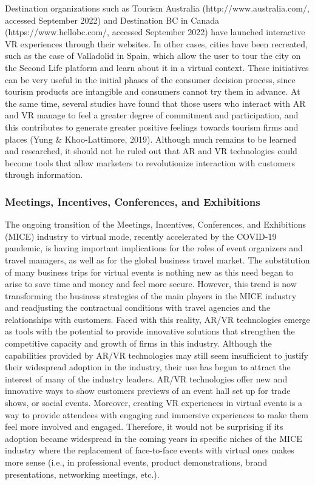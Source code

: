 \documentclass[
  letterpaper,
  DIV=11,
  numbers=noendperiod]{scrreprt}
\begin{document}
Destination organizations such as Tourism Australia
(http://www.australia.com/, accessed September 2022) and Destination BC
in Canada (https://www.hellobc.com/, accessed September 2022) have
launched interactive VR experiences through their websites. In other
cases, cities have been recreated, such as the case of Valladolid in
Spain, which allow the user to tour the city on the Second Life platform
and learn about it in a virtual context. These initiatives can be very
useful in the initial phases of the consumer decision process, since
tourism products are intangible and consumers cannot try them in
advance. At the same time, several studies have found that those users
who interact with AR and VR manage to feel a greater degree of
commitment and participation, and this contributes to generate greater
positive feelings towards tourism firms and places (Yung \&
Khoo-Lattimore, 2019). Although much remains to be learned and
researched, it should not be ruled out that AR and VR technologies could
become tools that allow marketers to revolutionize interaction with
customers through information.

\hypertarget{meetings-incentives-conferences-and-exhibitions}{%
\subsubsection{Meetings, Incentives, Conferences, and
Exhibitions}\label{meetings-incentives-conferences-and-exhibitions}}

The ongoing transition of the Meetings, Incentives, Conferences, and
Exhibitions (MICE) industry to virtual mode, recently accelerated by the
COVID-19 pandemic, is having important implications for the roles of
event organizers and travel managers, as well as for the global business
travel market. The substitution of many business trips for virtual
events is nothing new as this need began to arise to save time and money
and feel more secure. However, this trend is now transforming the
business strategies of the main players in the MICE industry and
readjusting the contractual conditions with travel agencies and the
relationships with customers. Faced with this reality, AR/VR
technologies emerge as tools with the potential to provide innovative
solutions that strengthen the competitive capacity and growth of firms
in this industry. Although the capabilities provided by AR/VR
technologies may still seem insufficient to justify their widespread
adoption in the industry, their use has begun to attract the interest of
many of the industry leaders. AR/VR technologies offer new and
innovative ways to show customers previews of an event hall set up for
trade shows, or social events. Moreover, creating VR experiences in
virtual events is a way to provide attendees with engaging and immersive
experiences to make them feel more involved and engaged. Therefore, it
would not be surprising if its adoption became widespread in the coming
years in specific niches of the MICE industry where the replacement of
face-to-face events with virtual ones makes more sense (i.e., in
professional events, product demonstrations, brand presentations,
networking meetings, etc.).
\end{document}
